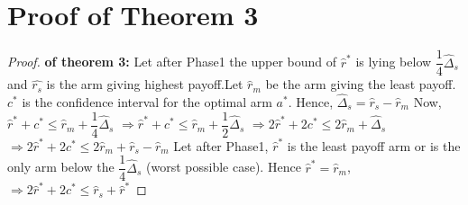 \appendix
\section{Proof of Theorem 3}

\begin{proof}\textbf{ of theorem 3:}
Let after Phase1 the upper bound of $\hat{r}^{*}$ is lying below $\dfrac{1}{4}\hat{\Delta}_{s}$ and $\hat{r_{s}}$ is the arm giving highest payoff.Let $\hat{r}_{m}$ be the arm giving the least payoff. $c^{*}$ is the confidence interval for the optimal arm $a^{*}$.
\newline
Hence, $\hat{\Delta}_{s}=\hat{r}_{s} - \hat{r}_{m}$
\newline
Now, $\hat{r}^{*}+c^{*} \leq \hat{r}_{m} + \dfrac{1}{4}\hat{\Delta}_{s}$
\newline
$\Rightarrow \hat{r}^{*}+c^{*} \leq \hat{r}_{m} + \dfrac{1}{2}\hat{\Delta}_{s}$
$\Rightarrow 2\hat{r}^{*}+2c^{*} \leq 2\hat{r}_{m} + \hat{\Delta}_{s}$
\newline
\hspace*{10em}$\Rightarrow 2\hat{r}^{*}+2c^{*} \leq 2\hat{r}_{m} + \hat{r}_{s}-\hat{r}_{m}$
\newline
Let after Phase1, $\hat{r}^{*}$ is the least payoff arm or is the only arm below the $\dfrac{1}{4}\hat{\Delta}_{s}$ (worst possible case). Hence $\hat{r}^{*}=\hat{r}_{m}$, 
\newline
\hspace*{8em}$\Rightarrow 2\hat{r}^{*}+2c^{*} \leq \hat{r}_{s}+\hat{r}^{*}$

\end{proof}
